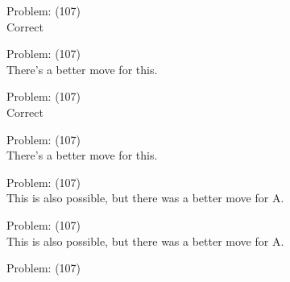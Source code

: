 \documentclass[11pt]{article}
\begin{document}
\begin{minipage}[t]{0.5\textwidth}
  {\centering
  
Problem: (107)\\
Correct\\
  }
\end{minipage}
\begin{minipage}[t]{0.5\textwidth}
  {\centering
  
Problem: (107)\\
There's a better move for this.\\
  }
\end{minipage}
\begin{minipage}[t]{0.5\textwidth}
  {\centering
  
Problem: (107)\\
Correct\\
  }
\end{minipage}
\begin{minipage}[t]{0.5\textwidth}
  {\centering
  
Problem: (107)\\
There's a better move for this.\\
  }
\end{minipage}
\begin{minipage}[t]{0.5\textwidth}
  {\centering
  
Problem: (107)\\
This is also possible, but there was a better move for A.\\
  }
\end{minipage}
\begin{minipage}[t]{0.5\textwidth}
  {\centering
  
Problem: (107)\\
This is also possible, but there was a better move for A.\\
  }
\end{minipage}
\begin{minipage}[t]{0.5\textwidth}
  {\centering
  
Problem: (107)\\
  }
\end{minipage}
\end{document}
